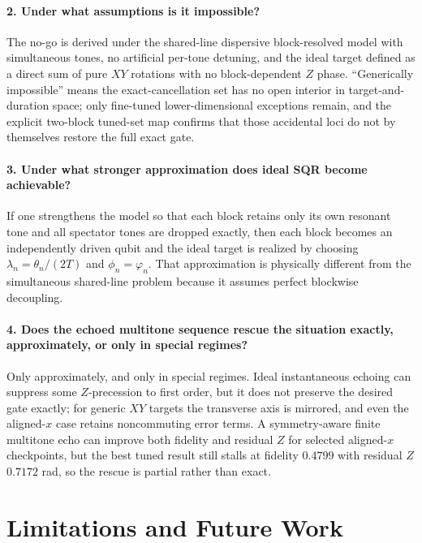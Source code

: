 \documentclass[aps,pra,twocolumn,reprint,floatfix,amsmath,amssymb]{revtex4-2}
\begin{document}
\paragraph*{2. Under what assumptions is it impossible?}
The no-go is derived under the shared-line dispersive block-resolved model with simultaneous tones, no artificial per-tone detuning, and the ideal target defined as a direct sum of pure \(XY\) rotations with no block-dependent \(Z\) phase. ``Generically impossible'' means the exact-cancellation set has no open interior in target-and-duration space; only fine-tuned lower-dimensional exceptions remain, and the explicit two-block tuned-set map confirms that those accidental loci do not by themselves restore the full exact gate.

\paragraph*{3. Under what stronger approximation does ideal SQR become achievable?}
If one strengthens the model so that each block retains only its own resonant tone and all spectator tones are dropped exactly, then each block becomes an independently driven qubit and the ideal target is realized by choosing \(\lambda_n=\theta_n/(2T)\) and \(\phi_n=\varphi_n\). That approximation is physically different from the simultaneous shared-line problem because it assumes perfect blockwise decoupling.

\paragraph*{4. Does the echoed multitone sequence rescue the situation exactly, approximately, or only in special regimes?}
Only approximately, and only in special regimes. Ideal instantaneous echoing can suppress some \(Z\)-precession to first order, but it does not preserve the desired gate exactly; for generic \(XY\) targets the transverse axis is mirrored, and even the aligned-\(x\) case retains noncommuting error terms. A symmetry-aware finite multitone echo can improve both fidelity and residual \(Z\) for selected aligned-\(x\) checkpoints, but the best tuned result still stalls at fidelity \(0.4799\) with residual \(Z\) \(0.7172\) rad, so the rescue is partial rather than exact.

\section{Limitations and Future Work}
\label{sec:limitations}
\end{document}
